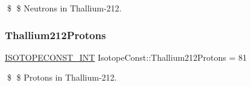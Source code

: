 \$ \$ Neutrons in Thallium-\/212. \mbox{\label{group___isotope_const-_thallium-_tl212_ga6cbc7760ec8fb3af1ebd42dbf32fccdd}} 
\subsubsection{\texorpdfstring{Thallium212\+Protons}{Thallium212Protons}}
{\footnotesize\ttfamily \mbox{\hyperlink{group___isotope_const-_macros_ga5f18360b3e99483a35c32d789e62621c}{I\+S\+O\+T\+O\+P\+E\+C\+O\+N\+S\+T\+\_\+\+I\+NT}} Isotope\+Const\+::\+Thallium212\+Protons = 81}

\$ \$ Protons in Thallium-\/212. 